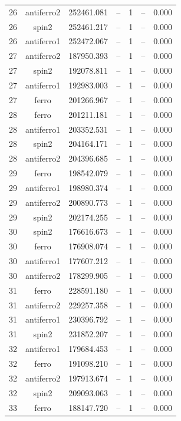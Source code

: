 \begin{longtable}{@{}ccrrrrr@{}}
26 & antiferro2 & 252461.081 & -- & 1 & -- & 0.000 \\
26 & spin2 & 252461.217 & -- & 1 & -- & 0.000 \\
26 & antiferro1 & 252472.067 & -- & 1 & -- & 0.000 \\
\rowcolor{gray!20} 27 & antiferro2 & 187950.393 & -- & 1 & -- & 0.000 \\
27 & spin2 & 192078.811 & -- & 1 & -- & 0.000 \\
27 & antiferro1 & 192983.003 & -- & 1 & -- & 0.000 \\
27 & ferro & 201266.967 & -- & 1 & -- & 0.000 \\
\rowcolor{gray!20} 28 & ferro & 201211.181 & -- & 1 & -- & 0.000 \\
28 & antiferro1 & 203352.531 & -- & 1 & -- & 0.000 \\
28 & spin2 & 204164.171 & -- & 1 & -- & 0.000 \\
28 & antiferro2 & 204396.685 & -- & 1 & -- & 0.000 \\
\rowcolor{gray!20} 29 & ferro & 198542.079 & -- & 1 & -- & 0.000 \\
29 & antiferro1 & 198980.374 & -- & 1 & -- & 0.000 \\
29 & antiferro2 & 200890.773 & -- & 1 & -- & 0.000 \\
29 & spin2 & 202174.255 & -- & 1 & -- & 0.000 \\
\rowcolor{gray!20} 30 & spin2 & 176616.673 & -- & 1 & -- & 0.000 \\
30 & ferro & 176908.074 & -- & 1 & -- & 0.000 \\
30 & antiferro1 & 177607.212 & -- & 1 & -- & 0.000 \\
30 & antiferro2 & 178299.905 & -- & 1 & -- & 0.000 \\
\rowcolor{gray!20} 31 & ferro & 228591.180 & -- & 1 & -- & 0.000 \\
31 & antiferro2 & 229257.358 & -- & 1 & -- & 0.000 \\
31 & antiferro1 & 230396.792 & -- & 1 & -- & 0.000 \\
31 & spin2 & 231852.207 & -- & 1 & -- & 0.000 \\
\rowcolor{gray!20} 32 & antiferro1 & 179684.453 & -- & 1 & -- & 0.000 \\
32 & ferro & 191098.210 & -- & 1 & -- & 0.000 \\
32 & antiferro2 & 197913.674 & -- & 1 & -- & 0.000 \\
32 & spin2 & 209093.063 & -- & 1 & -- & 0.000 \\
\rowcolor{gray!20} 33 & ferro & 188147.720 & -- & 1 & -- & 0.000 \\

\end{longtable}
